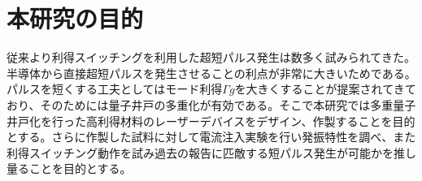 
\clearpage
\section{本研究の目的}

従来より利得スイッチングを利用した超短パルス発生は数多く試みられてきた。半導体から直接超短パルスを発生させることの利点が非常に大きいためである。パルスを短くする工夫としてはモード利得$\Gamma g$を大きくすることが提案されてきており、そのためには量子井戸の多重化が有効である。そこで本研究では多重量子井戸化を行った高利得材料のレーザーデバイスをデザイン、作製することを目的とする。さらに作製した試料に対して電流注入実験を行い発振特性を調べ、また利得スイッチング動作を試み過去の報告に匹敵する短パルス発生が可能かを推し量ることを目的とする。